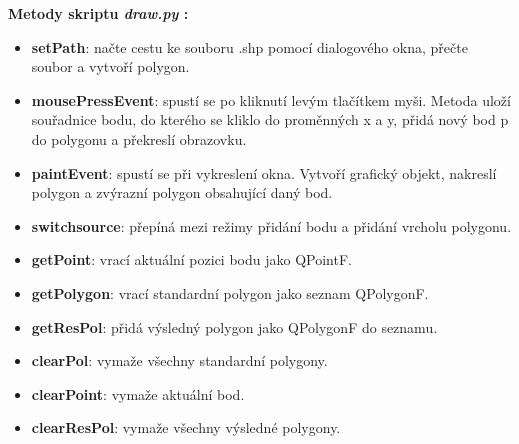\documentclass[a4paper,12pt]{article}
\begin{document}
    \textbf{Metody skriptu \emph{draw.py} :}
    \begin{itemize}
        \item \textbf{setPath}: načte cestu ke souboru .shp pomocí dialogového okna, přečte soubor a vytvoří polygon.
        
        \item \textbf{mousePressEvent}: spustí se po kliknutí levým tlačítkem myši. Metoda uloží souřadnice bodu, do kterého se kliklo do proměnných x a y, přidá nový bod p do polygonu a překreslí obrazovku.

        \item \textbf{paintEvent}: spustí se při vykreslení okna. Vytvoří grafický objekt, nakreslí polygon a zvýrazní polygon obsahující daný bod.

        \item \textbf{switchsource}: přepíná mezi režimy přidání bodu a přidání vrcholu polygonu.
        \item \textbf{getPoint}: vrací aktuální pozici bodu jako QPointF.
        \item \textbf{getPolygon}: vrací standardní polygon jako seznam QPolygonF.
        \item \textbf{getResPol}: přidá výsledný polygon jako QPolygonF do seznamu.
        \item \textbf{clearPol}: vymaže všechny standardní polygony.
        \item \textbf{clearPoint}: vymaže aktuální bod.
        \item \textbf{clearResPol}: vymaže všechny výsledné polygony.

    \end{itemize}
\end{document}
